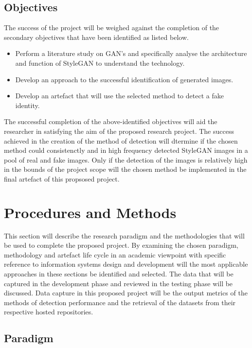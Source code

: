 \subsection{Objectives}

The success of the project will be weighed against the completion of the secondary objectives that have been identified as listed below.

\begin{itemize}
	\item Perform a literature study on GAN's and specifically analyse the architecture and function of StyleGAN to understand the technology.
	\item Develop an approach to the successful identification of generated images.
	\item Develop an artefact that will use the selected method to detect a fake identity. 
\end{itemize}

The successful completion of the above-identified objectives will aid the researcher in satisfying the aim of the proposed research project. The success achieved in the creation of the method of detection will dtermine if the chosen method could consistenctly and in high frequency detected StyleGAN images in a pool of real and fake images. Only if the detection of the images is relatively high in the bounds of the project scope will the chosen method be implemented in the final artefact of this propsosed project.

\section{Procedures and Methods}

This section will describe the research paradigm and the methodologies that will be used to complete the proposed project. By examining the chosen paradigm, methodology and artefact life cycle in an academic viewpoint with specific reference to information systems design and development will the most applicable approaches in these sections be identified and selected. The data that will be captured in the development phase and reviewed in the testing phase will be discussed. Data capture in this proposed project will be the output metrics of the methods of detection performance and the retrieval of the datasets from their respective hosted repositories.

\subsection{Paradigm}

